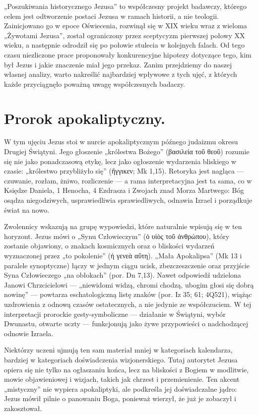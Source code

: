 „Poszukiwania historycznego Jezusa” to współczesny projekt badawczy, którego celem jest odtworzenie postaci Jezusa w ramach historii, a nie teologii.
Zainicjowano go w epoce Oświecenia, rozwinął się w XIX wieku wraz z wieloma „Żywotami Jezusa”, został ograniczony przez sceptycyzm pierwszej połowy XX wieku, a następnie odrodził się po połowie stulecia w kolejnych falach.
Od tego czasu niezliczone prace proponowały konkurencyjne hipotezy dotyczące tego, kim był Jezus i jakie znaczenie miał jego przekaz.
Zanim przejdziemy do naszej własnej analizy, warto nakreślić najbardziej wpływowe z tych ujęć, z których każde przyciągnęło poważną uwagę współczesnych badaczy.

\section{Prorok apokaliptyczny.}\label{sec:apocalyptic}

W tym ujęciu Jezus stoi w nurcie apokaliptycznym późnego judaizmu okresu Drugiej Świątyni.
Jego głoszenie „królestwa Bożego” (βασιλεία τοῦ θεοῦ) rozumie się nie jako ponadczasową etykę, lecz jako ogłoszenie wydarzenia bliskiego w czasie: „królestwo przybliżyło się” (ἤγγικεν; Mk 1,15).
Retoryka jest nagląca — czuwanie, rozłam, żniwo, rozliczenie — a rama interpretacyjna jest ta sama, co w Księdze Daniela, 1 Henocha, 4 Ezdrasza i Zwojach znad Morza Martwego: Bóg osądza niegodziwych, usprawiedliwia sprawiedliwych, odnawia Izrael i porządkuje świat na nowo.

Zwolennicy wskazują na grupę wypowiedzi, które naturalnie wpisują się w ten horyzont.
Jezus mówi o „Synu Człowieczym” (ὁ υἱὸς τοῦ ἀνθρώπου), który zostanie objawiony, o znakach kosmicznych oraz o bliskości wydarzeń wyznaczonej przez „to pokolenie” (ἡ γενεὰ αὕτη).
„Mała Apokalipsa” (Mk 13 i paralele synoptyczne) łączy w jednym ciągu ucisk, zbezczeszczenie oraz przyjście Syna Człowieczego „na obłokach” (por. Dn 7,13).
Nawet odpowiedź udzielona Janowi Chrzcicielowi — „niewidomi widzą, chromi chodzą, ubogim głosi się dobrą nowinę” — powtarza eschatologiczną listę znaków (por. Iz 35; 61; 4Q521), wiążąc uzdrowienia z odnową czasów ostatecznych, a nie jedynie ze współczuciem.
W tej interpretacji prorockie gesty-symboliczne — działanie w Świątyni, wybór Dwunastu, otwarte uczty — funkcjonują jako żywe przypowieści o nadchodzącej odnowie Izraela.

Niektórzy uczeni ujmują ten sam materiał mniej w kategoriach kalendarza, bardziej w kategoriach doświadczenia wizjonerskiego.
Tutaj autorytet Jezusa opiera się nie tylko na ogłaszaniu końca, lecz na bliskości z Bogiem w modlitwie, mowie objawieniowej i wizjach, takich jak chrzest i przemienienie.
Ten akcent „mistyczny” nie wypiera apokaliptyki, ale podkreśla jej doświadczalne jądro: Jezus mówił pilnie o panowaniu Boga, ponieważ wierzył, że już je zobaczył i zakosztował.

